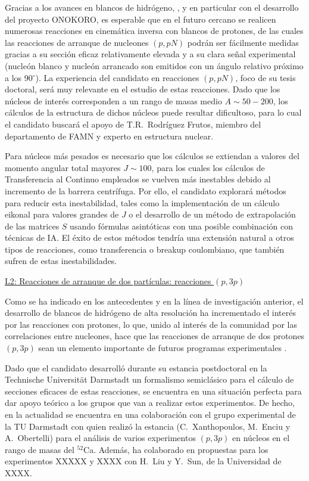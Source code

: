 \documentclass[a4paper,12pt,twoside]{article}
\begin{document}
Gracias a los avances en blancos de hidrógeno, \cite{minos,onokoro}, y en particular con el desarrollo del proyecto ONOKORO, es esperable que en el futuro cercano se realicen numerosas reacciones en cinemática inversa con blancos de protones, de las cuales las reacciones de arranque de nucleones $(p,pN)$ podrán ser fácilmente medidas gracias a su sección eficaz relativamente elevada y a su clara señal experimental (nucleón blanco y nucleón arrancado son emitidos con un ángulo relativo próximo a los 90$^\circ$). La experiencia del candidato en reacciones $(p,pN)$, foco de su tesis doctoral, será muy relevante en el estudio de estas reacciones. Dado que los núcleos de interés corresponden a un rango de masas medio $A\sim 50-200$, los cálculos de la estructura de dichos núcleos puede resultar dificultoso, para lo cual el candidato buscará el apoyo de T.R.~Rodríguez Frutos, miembro del departamento de FAMN y experto en estructura nuclear.

Para núcleos más pesados es necesario que los cálculos se extiendan a valores del momento angular total mayores $J\sim 100$, para los cuales los cálculos de Transferencia al Continuo empleados se vuelven más inestables debido al incremento de la barrera centrífuga. Por ello, el candidato explorará métodos para reducir esta inestabilidad, tales como la implementación de un cálculo eikonal para valores grandes de $J$ o el desarrollo de un método de extrapolación de las matrices $S$ usando fórmulas asintóticas con una posible combinación con técnicas de IA. El éxito de estos métodos tendría una extensión natural a otros tipos de reacciones, como transferencia o breakup coulombiano, que también sufren de estas inestabilidades.

\underline{L2: Reacciones de arranque de dos partículas: reacciones $(p,3p)$}

Como se ha indicado en los antecedentes y en la línea de investigación anterior, el desarrollo de blancos de hidrógeno de alta resolución ha incrementado el interés por las reacciones con protones, lo que, unido al interés de la comunidad por las correlaciones entre nucleones, hace que las reacciones de arranque de dos protones $(p,3p)$ sean un elemento importante de futuros programas experimentales \cite{onokoro}.

Dado que el candidato desarrolló durante su estancia postdoctoral en la Technische Universität Darmstadt un formalismo semiclásico para el cálculo de secciones eficaces de estas reacciones, se encuentra en una situación perfecta para dar apoyo teórico a los grupos que van a realizar estos experimentos. De hecho, en la actualidad se encuentra en una colaboración con el grupo experimental de la TU Darmstadt con quien realizó la estancia (C.~Xanthopoulos, M.~Enciu y A.~Obertelli) para el análisis de varios experimentos $(p,3p)$ en núcleos en el rango de masas del $^{52}$Ca. Además, ha colaborado en propuestas para los experimentos XXXXX y XXXX con H.~Liu y Y.~Sun, de la Universidad de XXXX.
\end{document}
